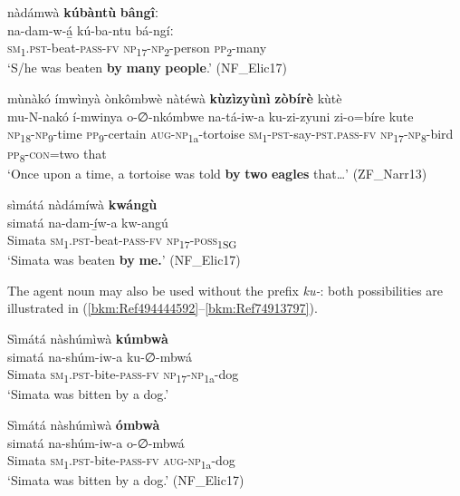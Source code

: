 \ea
\label{bkm:Ref71206307}
nàdámwà \textbf{kúbàntù} \textbf{bângîː}\\
\gll na-dam-w-á̲      kú-ba-ntu    bá-ngíː\\
\textsc{sm}\textsubscript{1}.\textsc{pst}-beat-\textsc{pass}-\textsc{fv}  \textsc{np}\textsubscript{17}-\textsc{np}\textsubscript{2}-person  \textsc{pp}\textsubscript{2}-many\\
\glt ‘S/he was beaten \textbf{by} \textbf{many} \textbf{people}.’ (NF\_Elic17)
\z

\ea
\label{bkm:Ref71206308}
mùnàkó ímwìnyà ònkômbwè nàtéwà \textbf{kùzìzyùnì} \textbf{zòbírè} kùtè\\
\gll mu-N-nakó    í-mwinya  o-∅-nkómbwe  na-tá-iw-a  ku-zi-zyuni    zi-o=bíre  kute\\
\textsc{np}\textsubscript{18}-\textsc{np}\textsubscript{9}-time  \textsc{pp}\textsubscript{9}-certain  \textsc{aug}-\textsc{np}\textsubscript{1a}-tortoise  \textsc{sm}\textsubscript{1}-\textsc{pst}-say-\textsc{pst}.\textsc{pass}-\textsc{fv}
\textsc{np}\textsubscript{17}-\textsc{np}\textsubscript{8}-bird  \textsc{pp}\textsubscript{8}-\textsc{con}=two  that\\
\glt ‘Once upon a time, a tortoise was told \textbf{by} \textbf{two} \textbf{eagles} that…’ (ZF\_Narr13)
\z

\ea
\label{bkm:Ref71206356}
sìmátá nàdámíwà \textbf{kwángù}\\
\gll simatá    na-dam-í̲w-a      kw-angú\\
Simata  \textsc{sm}\textsubscript{1}.\textsc{pst}-beat-\textsc{pass}-\textsc{fv}  \textsc{np}\textsubscript{17}-\textsc{poss}\textsubscript{1SG}\\
\glt ‘Simata was beaten \textbf{by} \textbf{me.}’ (NF\_Elic17)
\z

The agent noun may also be used without the prefix \textit{ku-}: both possibilities are illustrated in (\ref{bkm:Ref494444592}--\ref{bkm:Ref74913797}).

\ea
\label{bkm:Ref494444592}
Sìmátá nàshúmìwà \textbf{kúmbwà}\\
\gll simatá    na-shúm-iw-a    ku-∅-mbwá\\
Simata  \textsc{sm}\textsubscript{1}.\textsc{pst}-bite-\textsc{pass}-\textsc{fv}  \textsc{np}\textsubscript{17}-\textsc{np}\textsubscript{1a}-dog\\
\glt ‘Simata was bitten by a dog.’
\z

\ea
\label{bkm:Ref74913797}
Sìmátá nàshúmìwà \textbf{ómbwà}\\
\gll simatá    na-shúm-iw-a    o-∅-mbwá\\
Simata  \textsc{sm}\textsubscript{1}.\textsc{pst}-bite-\textsc{pass}-\textsc{fv}  \textsc{aug}-\textsc{np}\textsubscript{1a}-dog\\
\glt ‘Simata was bitten by a dog.’ (NF\_Elic17)
\z


